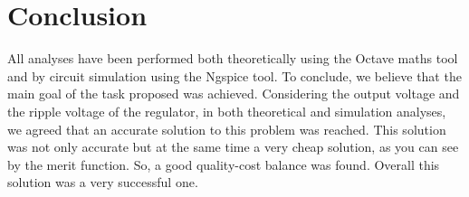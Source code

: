 \section{Conclusion}
\label{resan}
All analyses have been performed both theoretically using the Octave maths tool and by circuit simulation using the Ngspice tool.
To conclude, we believe that the main goal of the task proposed was achieved. Considering the output voltage and the ripple voltage of the regulator, in both theoretical and simulation analyses, we agreed that an accurate solution to this problem was reached. This solution was not only accurate but at the same time a very cheap solution, as you can see by the merit function. So, a good quality-cost balance was found. Overall this solution was a very successful one.  

